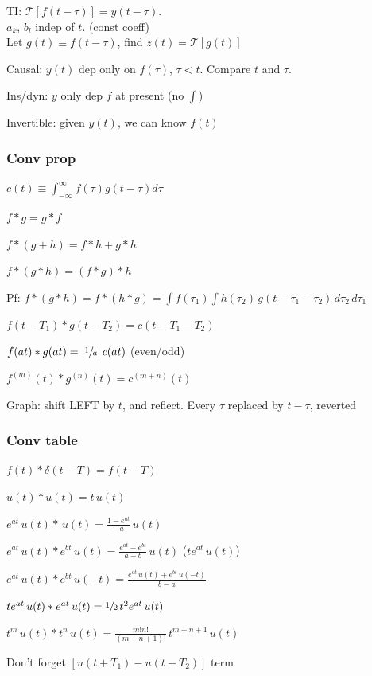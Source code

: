 \documentclass[4pt]{article}
\theoremstyle{definition}
\theoremstyle{definition}
\begin{document}
\begin{landscape}
\begin{multicols}{3}
    TI: $\mathcal{T}[f(t-\tau)] = y(t-\tau)$.\\
    $a_k$, $b_l$ indep of $t$. (const coeff)\\
    Let $g(t)\equiv f(t-\tau)$, find $z(t) = \mathcal{T}[g(t)]$


    Causal: $y(t)$ dep only on $f(\tau)$, $\tau < t$. 
    Compare $t$ and $\tau$.
    
    Ins/dyn: $y$ only dep $f$ at present (no $\int$)
    
    Invertible: given $y(t)$, we can know $f(t)$
\subsubsection*{Conv prop}
    $c(t) \equiv \int_{-\infty}^{\infty} f(\tau) g(t-\tau) d\tau$

    $f * g = g * f$
    
    $f * (g + h) = f * h + g * h$
    
    $f * (g * h) = (f * g) * h$

        Pf: $f * (g * h) = f * (h * g) = \int f(\tau_1) \int h(\tau_2)\, g(t - \tau_1 - \tau_2) \, d\tau_2 \, d\tau_1$
    
     $f(t - T_1) * g(t - T_2) = c(t - T_1 - T_2)$

     $f(at) * g(at) = |\sfrac{1}{a}|\, c(at)$ (even/odd)

     $f^{(m)} (t) * g^{(n)} (t) = c^{(m+n)}(t)$


    Graph: shift LEFT by $t$, and reflect. Every $\tau$ replaced by $t-\tau$, reverted
\columnbreak
\subsubsection*{Conv table}
    $f(t) * \delta(t-T) = f(t-T)$
    
    $u(t) * u(t) = t \, u(t)$

    $e^{at} \,u(t)* \,u(t) = \frac{1-e^{at}}{-a}\, u(t)$

    $e^{at}\,u(t) * e^{bt}\,u(t) = \frac{e^{at} - e^{bt}}{a - b}\, u(t)$ ($te^{at} \, u(t)$) 

    $e^{at}\, u(t) * e^{bt} \,u(-t) = \frac{e^{at} \, u(t) + e^{bt} \, u(-t)}{b-a}$

    $te^{at}\,u(t) * e^{at} \,u(t)= \sfrac{1}{2} \,t^2e^{at} \, u(t)$

    $t^m\, u(t) * t^n \, u(t) = \frac{m!n!}{(m+n+1)!}\, t^{m+n+1} \, u(t)$

    Don't forget $[u(t+T_1) - u(t-T_2)]$ term

\end{multicols}
\end{landscape}
\end{document}
